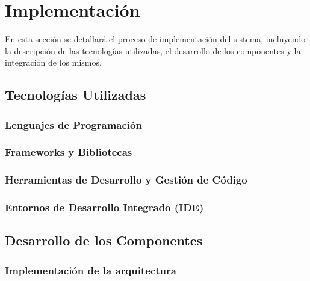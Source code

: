 \section{Implementación}

En esta sección se detallará el proceso de implementación del sistema, incluyendo la descripción de las tecnologías utilizadas, el desarrollo de los componentes y la integración de los mismos.

    \subsection{Tecnologías Utilizadas}


    
        \subsubsection{Lenguajes de Programación}
        \subsubsection{Frameworks y Bibliotecas}
        \subsubsection{Herramientas de Desarrollo y Gestión de Código}
        \subsubsection{Entornos de Desarrollo Integrado (IDE)}

    \subsection{Desarrollo de los Componentes}


        \subsubsection{Implementación de la arquitectura}
